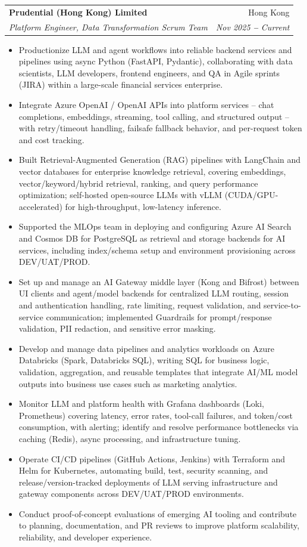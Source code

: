 \documentclass[letterpaper,11pt]{article}
\makeatletter
\newcommand{\resumeItem}[1]{
  \item\small{
    {#1 \vspace{-2pt}}
  }
}
\newcommand{\resumeSubheading}[4]{
  \vspace{-2pt}\item
    \begin{tabular*}{0.97\textwidth}[t]{l@{\extracolsep{\fill}}r}
      \textbf{#1} & #2 \\
      \textit{\small#3} & \textit{\small #4} \\
    \end{tabular*}\vspace{-7pt}
}
\newcommand{\resumeItemListStart}{\begin{itemize}}
\newcommand{\resumeItemListEnd}{\end{itemize}\vspace{-5pt}}
\makeatother
\begin{document}
    \resumeSubheading
      {Prudential (Hong Kong) Limited}{Hong Kong}
      {Platform Engineer, Data Transformation Scrum Team}{Nov 2025 \textbf{--} Current}
        \resumeItemListStart
            \resumeItem{Productionize LLM and agent workflows into reliable backend services and pipelines using async Python (FastAPI, Pydantic), collaborating with data scientists, LLM developers, frontend engineers, and QA in Agile sprints (JIRA) within a large-scale financial services enterprise.}
            \resumeItem{Integrate Azure OpenAI / OpenAI APIs into platform services -- chat completions, embeddings, streaming, tool calling, and structured output -- with retry/timeout handling, failsafe fallback behavior, and per-request token and cost tracking.}
            \resumeItem{Built Retrieval-Augmented Generation (RAG) pipelines with LangChain and vector databases for enterprise knowledge retrieval, covering embeddings, vector/keyword/hybrid retrieval, ranking, and query performance optimization; self-hosted open-source LLMs with vLLM (CUDA/GPU-accelerated) for high-throughput, low-latency inference.}
            \resumeItem{Supported the MLOps team in deploying and configuring Azure AI Search and Cosmos DB for PostgreSQL as retrieval and storage backends for AI services, including index/schema setup and environment provisioning across DEV/UAT/PROD.}
            \resumeItem{Set up and manage an AI Gateway middle layer (Kong and Bifrost) between UI clients and agent/model backends for centralized LLM routing, session and authentication handling, rate limiting, request validation, and service-to-service communication; implemented Guardrails for prompt/response validation, PII redaction, and sensitive error masking.}
            \resumeItem{Develop and manage data pipelines and analytics workloads on Azure Databricks (Spark, Databricks SQL), writing SQL for business logic, validation, aggregation, and reusable templates that integrate AI/ML model outputs into business use cases such as marketing analytics.}
            \resumeItem{Monitor LLM and platform health with Grafana dashboards (Loki, Prometheus) covering latency, error rates, tool-call failures, and token/cost consumption, with alerting; identify and resolve performance bottlenecks via caching (Redis), async processing, and infrastructure tuning.}
            \resumeItem{Operate CI/CD pipelines (GitHub Actions, Jenkins) with Terraform and Helm for Kubernetes, automating build, test, security scanning, and release/version-tracked deployments of LLM serving infrastructure and gateway components across DEV/UAT/PROD environments.}
            \resumeItem{Conduct proof-of-concept evaluations of emerging AI tooling and contribute to planning, documentation, and PR reviews to improve platform scalability, reliability, and developer experience.}
        \resumeItemListEnd
\end{document}
